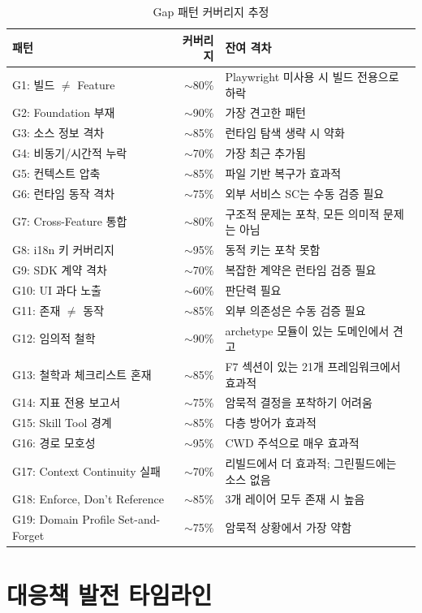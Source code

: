 \documentclass[11pt,a4paper,openright,twoside]{report}
\begin{document}
\begin{table}[H]
\centering
\caption{Gap 패턴 커버리지 추정}
\label{tab:gap-coverage}
\begin{tabularx}{\textwidth}{lrX}
\toprule
\textbf{패턴} & \textbf{커버리지} & \textbf{잔여 격차} \\
\midrule
G1: 빌드 $\neq$ Feature & $\sim$80\% & Playwright 미사용 시 빌드 전용으로 하락 \\
G2: Foundation 부재 & $\sim$90\% & 가장 견고한 패턴 \\
G3: 소스 정보 격차 & $\sim$85\% & 런타임 탐색 생략 시 약화 \\
G4: 비동기/시간적 누락 & $\sim$70\% & 가장 최근 추가됨 \\
G5: 컨텍스트 압축 & $\sim$85\% & 파일 기반 복구가 효과적 \\
G6: 런타임 동작 격차 & $\sim$75\% & 외부 서비스 SC는 수동 검증 필요 \\
G7: Cross-Feature 통합 & $\sim$80\% & 구조적 문제는 포착, 모든 의미적 문제는 아님 \\
G8: i18n 키 커버리지 & $\sim$95\% & 동적 키는 포착 못함 \\
G9: SDK 계약 격차 & $\sim$70\% & 복잡한 계약은 런타임 검증 필요 \\
G10: UI 과다 노출 & $\sim$60\% & 판단력 필요 \\
G11: 존재 $\neq$ 동작 & $\sim$85\% & 외부 의존성은 수동 검증 필요 \\
G12: 임의적 철학 & $\sim$90\% & archetype 모듈이 있는 도메인에서 견고 \\
G13: 철학과 체크리스트 혼재 & $\sim$85\% & F7 섹션이 있는 21개 프레임워크에서 효과적 \\
G14: 지표 전용 보고서 & $\sim$75\% & 암묵적 결정을 포착하기 어려움 \\
G15: Skill Tool 경계 & $\sim$85\% & 다층 방어가 효과적 \\
G16: 경로 모호성 & $\sim$95\% & CWD 주석으로 매우 효과적 \\
G17: Context Continuity 실패 & $\sim$70\% & 리빌드에서 더 효과적; 그린필드에는 소스 없음 \\
G18: Enforce, Don't Reference & $\sim$85\% & 3개 레이어 모두 존재 시 높음 \\
G19: Domain Profile Set-and-Forget & $\sim$75\% & 암묵적 상황에서 가장 약함 \\
\bottomrule
\end{tabularx}
\end{table}

\section{대응책 발전 타임라인}
\end{document}
